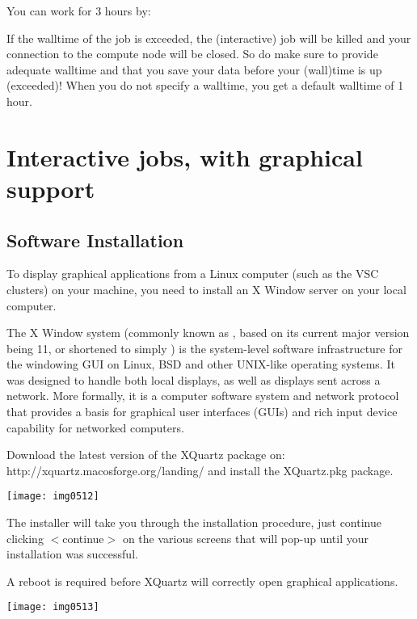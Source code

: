 You can work for 3 hours by:
\begin{prompt}
\end{prompt}

If the walltime of the job is exceeded, the (interactive) job will be killed
and your connection to the compute node will be closed. So do make sure to
provide adequate walltime and that you save your data before your (wall)time is
up (exceeded)!  When you do not specify a walltime, you get a default walltime
of 1 hour.

\section{Interactive jobs, with graphical support}

\subsection{Software Installation}

To display graphical applications from a Linux computer (such as the VSC
clusters) on your machine, you need to install an X Window server on your
local computer.

The X Window system (commonly known as , based on its current major
version being 11, or shortened to simply ) is the system-level
software infrastructure for the windowing GUI on Linux, BSD and other UNIX-like
operating systems. It was designed to handle both local displays, as well as
displays sent across a network. More formally, it is a computer software system
and network protocol that provides a basis for graphical user interfaces (GUIs)
and rich input device capability for networked computers.

\ifmac
  Download the latest version of the XQuartz package on:
  http://xquartz.macosforge.org/landing/
  and install the XQuartz.pkg package.

  \texttt{[image: img0512]}

  The installer will take you through the installation procedure, just continue
  clicking $<$continue$>$ on the various screens that will pop-up until your
  installation was successful.

  A reboot is required before XQuartz will correctly open graphical applications.
  
  \texttt{[image: img0513]}
\fi
\iflinux
\fi

